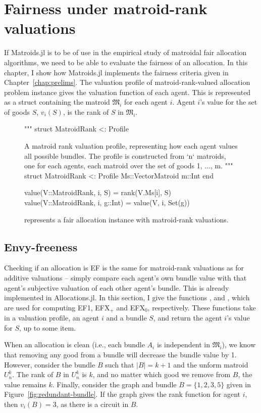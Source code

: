 \section{Fairness under matroid-rank valuations}
\label{sec:fairness-impl}
If Matroids.jl is to be of use in the empirical study of matroidal fair allocation algorithms, we need to be able to evaluate the fairness of an allocation. In this chapter, I show how Matroids.jl implements the fairness criteria given in Chapter~\ref{chap:prelims}. The valuation profile of matroid-rank-valued allocation problem instance gives the valuation function of each agent. This is represented as a struct containing the matroid $\mathfrak{M}_i$ for each agent $i$. Agent $i$'s value for the set of goods $S$, $v_i(S)$, is the rank of $S$ in $\mathfrak{M}_i$.
\begin{figure}[ht!]
\begin{jllisting}
"""
    struct MatroidRank <: Profile

A matroid rank valuation profile, representing how each agent values all possible bundles. The profile is constructed from `n` matroids, one for each agents, each matroid over the set of goods {1, ..., m}. 
"""
struct MatroidRank <: Profile
    Ms::Vector{Matroid}
    m::Int
end

value(V::MatroidRank, i, S) = rank(V.Ms[i], S)
value(V::MatroidRank, i, g::Int) = value(V, i, Set(g))
\end{jllisting}
\caption{ represents a fair allocation instance with matroid-rank valuations.}
\end{figure}

\subsection*{Envy-freeness}
Checking if an allocation is EF is the same for matroid-rank valuations as for additive valuations -- simply compare each agent's own bundle value with that agent's subjective valuation of each other agent's bundle. This is already implemented in Allocations.jl. In this section, I give the functions ,  and , which are used for computing EF1, EFX$_+$ and EFX$_0$, respectively. These functions take in a valuation profile, an agent $i$ and a bundle $S$, and return the agent $i$'s value for $S$, up to some item. 

When an allocation is clean (i.e., each bundle $A_i$ is independent in $\mathfrak{M}_i$), we know that removing any good from a bundle will decrease the bundle value by 1. However, consider the bundle $B$ such that $|B| = k+1$ and the unform matroid $U_n^k$. The rank of $B$ in $U_n^k$ is $k$, and no matter which good we remove from $B$, the value remains $k$. Finally, consider the graph and bundle $B=\{1,2,3,5\}$ given in Figure~\ref{fig:redundant-bundle}. If the graph gives the rank function for agent $i$, then $v_i(B) = 3$, as there is a circuit in $B$. \skelpar

